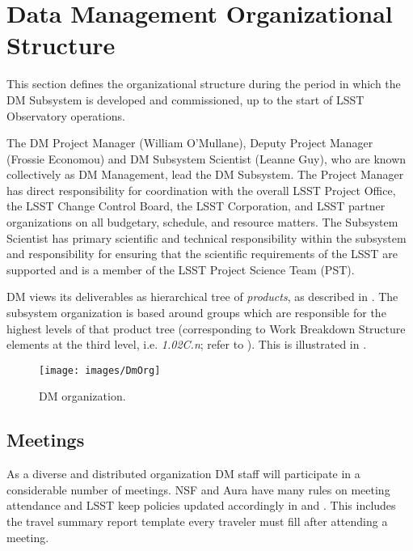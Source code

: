 \section{Data Management Organizational Structure}

This section defines the organizational structure during the period in which the \gls{DM} \gls{Subsystem} is developed and commissioned, up to the start of \gls{LSST} Observatory operations.

The \gls{DM} \gls{Project Manager} (William O'Mullane), Deputy \gls{Project Manager} (Frossie Economou) and \gls{DM} \gls{Subsystem Scientist} (Leanne Guy), who are known collectively as \gls{DM} Management, lead the \gls{DM} Subsystem.
The \gls{Project Manager} has direct responsibility for coordination with the overall \gls{LSST} Project Office, the \gls{LSST} \gls{Change Control Board}, the \gls{LSST} Corporation, and \gls{LSST} partner organizations on all budgetary, schedule, and resource matters.
The \gls{Subsystem Scientist} has primary scientific and technical responsibility within the subsystem and responsibility for ensuring that the scientific requirements of the \gls{LSST} are supported and is a member of the \gls{LSST} \gls{Project Science Team} (\gls{PST}).

DM views its deliverables as hierarchical tree of \textit{products}, as described in .
The subsystem organization is based around groups which are responsible for the highest levels of that product tree (corresponding to \gls{Work Breakdown Structure} elements at the third level, i.e. \textit{1.02C.n}; refer to ).
This is illustrated in .

\begin{figure}[htbp]
\begin{center}
 \texttt{[image: images/DmOrg]}
\caption{DM organization. \label{fig:dmorg}}
\end{center}
\end{figure}

\subsection {Meetings} \label{sect:meetings}

As a diverse and distributed organization \gls{DM} staff will participate in a considerable number of meetings.
NSF and Aura have many rules on meeting attendance and \gls{LSST} keep policies updated accordingly in  and . This includes the travel summary report template  every traveler must fill after attending a meeting.

